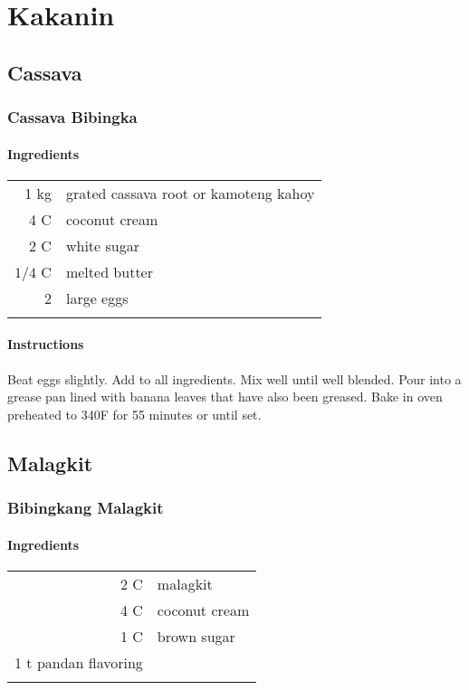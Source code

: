 \documentclass[12pt,landscape,twoside,twocolumn, openright, titlepage, draft]{book}
\begin{document}
\chapter{Kakanin}
\section{Cassava}
\subsection{Cassava Bibingka}
\subsubsection{Ingredients}
\begin{tabular}{r p{1.5in}}
  1 kg    & grated cassava root or kamoteng kahoy \\
  4 C     & coconut cream \\
  2 C     & white sugar \\
  $1/4$ C & melted butter \\
  2       & large eggs \\ \\
\end{tabular}
\subsubsection{Instructions}
Beat eggs slightly. Add to all ingredients. Mix well until well blended. Pour into a grease pan lined with banana leaves that have also been greased. Bake in oven preheated to 340F for 55 minutes or until set.

\section{Malagkit}
\subsection{Bibingkang Malagkit}
\subsubsection{Ingredients}
\begin{tabular}{r p{1.5in}}
  2 C & malagkit \\
  4 C & coconut cream \\
  1 C & brown sugar \\
  1 t pandan flavoring \\ \\
\end{tabular}
\end{document}
